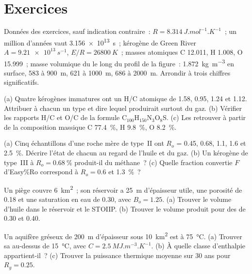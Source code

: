 \section*{Exercices}\label{sec:b2:energy-geology:exercises}

Données des exercices, sauf indication contraire~: $R = \qty{8.314}{J.mol^{-1}.K^{-1}}$~; un million
d'années vaut \qty{3.156e13}{s}~; kérogène de Green River $A = \qty{9.21e13}{s^{-1}}$, $E/R = \qty{26800}{K}$~;
masses atomiques C 12.011, H 1.008, O 15.999~; masse volumique du  le long du profil de la figure~:
\qty{1.872}{kg.m^{-3}} en surface, 583 à \qty{900}{m}, 621 à \qty{1000}{m}, 686 à
\qty{2000}{m}. Arrondir à trois chiffres significatifs.

\begin{exercise}[$\star$]\label{exo:b2:energy-geology:1}
(a) Quatre kérogènes immatures ont un H/C atomique de 1.58, 0.95, 1.24 et 1.12. Attribuer à chacun un type et dire
lequel produirait surtout du gaz. (b) Vérifier les rapports H/C et O/C de la formule
C$_{100}$H$_{150}$N$_3$O$_8$S. (c) Les retrouver à partir de la composition massique C \qty{77.4}{\percent}, H
\qty{9.8}{\percent}, O \qty{8.2}{\percent}.
\end{exercise}

\begin{exercise}[$\star$]\label{exo:b2:energy-geology:2}
(a) Cinq échantillons d'une roche mère de type~II ont $R_o$ = 0.45, 0.68, 1.1, 1.6 et \qty{2.5}{\percent}. Décrire l'état de chacun
au regard de l'huile et du gaz. (b) Un kérogène de type~III à $R_o =
\qty{0.68}{\percent}$ produit-il du méthane~? (c) Quelle fraction convertie $F$ d'Easy\%Ro correspond à
$R_o = 0.6$ et \qty{1.3}{\percent}~?
\end{exercise}

\begin{exercise}[$\star$]\label{exo:b2:energy-geology:3}
Un piège couvre \qty{6}{km^2}~; son réservoir a \qty{25}{m} d'épaisseur utile, une porosité de 0.18 et une saturation en eau de 0.30, avec $B_o = 1.25$.
(a) Trouver le volume d'huile dans le réservoir et le STOIIP. (b) Trouver le volume produit
pour des  de 0.30 et 0.40.
\end{exercise}

\begin{exercise}[$\star$]\label{exo:b2:energy-geology:4}
Un aquifère gréseux de \qty{200}{m} d'épaisseur sous \qty{10}{km^2} est à \qty{75}{\celsius}. (a) Trouver sa 
au-dessus de \qty{15}{\celsius}, avec $C = \qty{2.5}{MJ.m^{-3}.K^{-1}}$. (b) À quelle classe d'enthalpie appartient-il~? (c) Trouver la puissance thermique moyenne
sur 30 ans pour $R_g = 0.25$.
\end{exercise}

